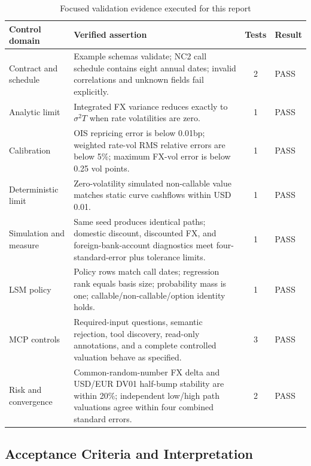 \documentclass[conference]{IEEEtran}
\begin{document}
\begin{table}[!t]
\centering
\begin{tabularx}{\textwidth}{>{\raggedright\arraybackslash}p{}>{\raggedright\arraybackslash}p{}c>{\raggedright\arraybackslash}X}
\toprule
\textbf{Control domain} & \textbf{Verified assertion} & \textbf{Tests} & \textbf{Result} \\
\midrule
Contract and schedule & Example schemas validate; NC2 call schedule contains eight annual dates; invalid correlations and unknown fields fail explicitly. & 2 & \textcolor{pass}{PASS} \\
Analytic limit & Integrated FX variance reduces exactly to $\sigma^2T$ when rate volatilities are zero. & 1 & \textcolor{pass}{PASS} \\
Calibration & OIS repricing error is below 0.01bp; weighted rate-vol RMS relative errors are below 5\%; maximum FX-vol error is below 0.25 vol points. & 1 & \textcolor{pass}{PASS} \\
Deterministic limit & Zero-volatility simulated non-callable value matches static curve cashflows within USD 0.01. & 1 & \textcolor{pass}{PASS} \\
Simulation and measure & Same seed produces identical paths; domestic discount, discounted FX, and foreign-bank-account diagnostics meet four-standard-error plus tolerance limits. & 1 & \textcolor{pass}{PASS} \\
LSM policy & Policy rows match call dates; regression rank equals basis size; probability mass is one; callable/non-callable/option identity holds. & 1 & \textcolor{pass}{PASS} \\
MCP controls & Required-input questions, semantic rejection, tool discovery, read-only annotations, and a complete controlled valuation behave as specified. & 3 & \textcolor{pass}{PASS} \\
Risk and convergence & Common-random-number FX delta and USD/EUR DV01 half-bump stability are within 20\%; independent low/high path valuations agree within four combined standard errors. & 2 & \textcolor{pass}{PASS} \\
\bottomrule
\end{tabularx}
\caption{Focused validation evidence executed for this report}
\end{table}

\subsection{Acceptance Criteria and Interpretation}
\end{document}
